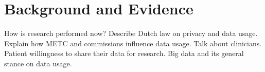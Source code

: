 \section{Background and Evidence}
How is research performed now?
Describe Dutch law on privacy and data usage.
Explain how METC and commissions influence data usage.
Talk about clinicians.
Patient willingness to share their data for research.
Big data and its general stance on data usage.